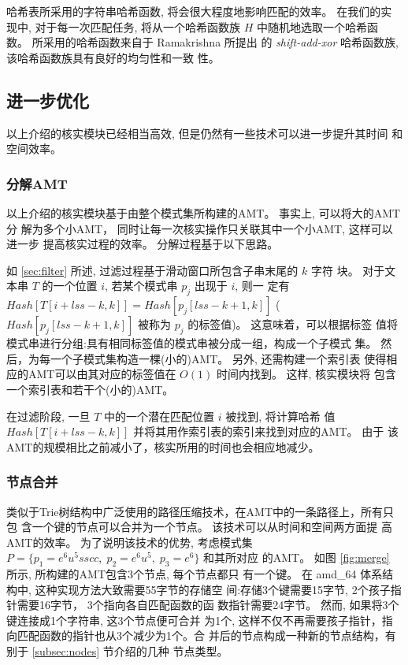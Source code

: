 哈希表所采用的字符串哈希函数, 将会很大程度地影响匹配的效率。 在我们的实
现中, 对于每一次匹配任务, 将从一个哈希函数族 $H$ 中随机地选取一个哈希函
数。 所采用的哈希函数来自于 Ramakrishna \cite{Ramakrishna1997} 所提出
的 \emph{shift-add-xor} 哈希函数族, 该哈希函数族具有良好的均匀性和一致
性。

\subsection{进一步优化}
\label{sec:further improments}

以上介绍的核实模块已经相当高效, 但是仍然有一些技术可以进一步提升其时间
和空间效率。

\subsubsection{分解AMT}
\label{sec:divide amt}

以上介绍的核实模块基于由整个模式集所构建的AMT。 事实上, 可以将大的AMT分
解为多个小AMT， 同时让每一次核实操作只关联其中一个小AMT, 这样可以进一步
提高核实过程的效率。 分解过程基于以下思路。

如 \ref{sec:filter} 所述, 过滤过程基于滑动窗口所包含子串末尾的 $k$ 字符
块。 对于文本串 $T$ 的一个位置 $i$, 若某个模式串 $p_j$ 出现于 $i$, 则一
定有 $Hash[T[i+lss-k,k]] = Hash[p_j[lss-k+1,k]]$
($Hash[p_j[lss-k+1,k]]$ 被称为 $p_j$ 的标签值)。 这意味着，可以根据标签
值将模式串进行分组:具有相同标签值的模式串被分成一组，构成一个子模式
集。 然后，为每一个子模式集构造一棵(小的)AMT。 另外, 还需构建一个索引表
使得相应的AMT可以由其对应的标签值在 $O(1)$ 时间内找到。 这样, 核实模块将
包含一个索引表和若干个(小的)AMT。

在过滤阶段, 一旦 $T$ 中的一个潜在匹配位置 $i$ 被找到, 将计算哈希
值 $Hash[T[i+lss-k,k]]$ 并将其用作索引表的索引来找到对应的AMT。 由于
该AMT的规模相比之前减小了，核实所用的时间也会相应地减少。

\subsubsection{节点合并}
\label{sec:node merge}

类似于Trie树结构中广泛使用的路径压缩技术，在AMT中的一条路径上，所有只包
含一个键的节点可以合并为一个节点。 该技术可以从时间和空间两方面提
高AMT的效率。 为了说明该技术的优势,
考虑模式集$P=\{p_1=e^6u^5sscc,\; p_2=e^6u^5,\; p_3=e^6\}$ 和其所对应
的AMT。 如图 \ref{fig:merge} 所示, 所构建的AMT包含3个节点, 每个节点都只
有一个键。 在 amd_64 体系结构中, 这种实现方法大致需要55字节的存储空
间:存储3个键需要15字节, 2个孩子指针需要16字节， 3个指向各自匹配函数的函
数指针需要24字节。 然而, 如果将3个键连接成1个字符串, 这3个节点便可合并
为1个, 这样不仅不再需要孩子指针，指向匹配函数的指针也从3个减少为1个。合
并后的节点构成一种新的节点结构，有别于 \ref{subsec:nodes} 节介绍的几种
节点类型。

